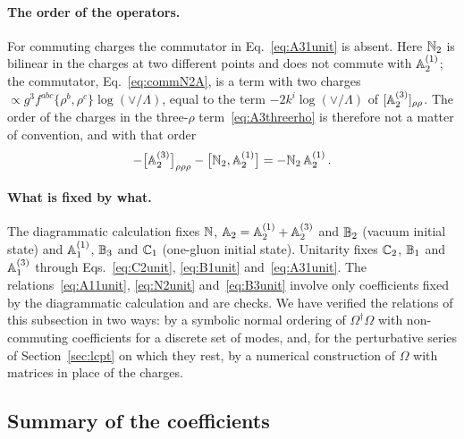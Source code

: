 \paragraph{The order of the operators.} For commuting charges the commutator in Eq.~\eqref{eq:A31unit} is absent. Here $\mathbb{N}_2$ is bilinear in the charges at two different points and does not commute with $\mathbb{A}^{(1)}_2$; the commutator, Eq.~\eqref{eq:commN2A}, is a term with two charges $\propto g^3f^{abc}\{\rho^b,\rho^c\}\log(\vee/\Lambda)$, equal to the term $-2k^i\log(\vee/\Lambda)$ of $[\mathbb{A}^{(3)}_2]_{\rho\rho}$. The order of the charges in the three-$\rho$ term~\eqref{eq:A3threerho} is therefore not a matter of convention, and with that order
\begin{align}\label{eq:N2Acomb}
-\big[\mathbb{A}^{(3)}_2\big]_{\rho\rho\rho}-\big[\mathbb{N}_2,\mathbb{A}^{(1)}_2\big]=-\mathbb{N}_2\,\mathbb{A}^{(1)}_2\,.
\end{align}

\paragraph{What is fixed by what.} The diagrammatic calculation fixes $\mathbb{N}$, $\mathbb{A}_2=\mathbb{A}^{(1)}_2+\mathbb{A}^{(3)}_2$ and $\mathbb{B}_2$ (vacuum initial state) and $\mathbb{A}^{(1)}_1$, $\mathbb{B}_3$ and $\mathbb{C}_1$ (one-gluon initial state). Unitarity fixes $\mathbb{C}_2$, $\mathbb{B}_1$ and $\mathbb{A}^{(3)}_1$ through Eqs.~\eqref{eq:C2unit}, \eqref{eq:B1unit} and~\eqref{eq:A31unit}. The relations~\eqref{eq:A11unit}, \eqref{eq:N2unit} and~\eqref{eq:B3unit} involve only coefficients fixed by the diagrammatic calculation and are checks. We have verified the relations of this subsection in two ways: by a symbolic normal ordering of $\Omega^\dagger\Omega$ with non-commuting coefficients for a discrete set of modes, and, for the perturbative series of Section~\ref{sec:lcpt} on which they rest, by a numerical construction of $\Omega$ with matrices in place of the charges.

\subsection{Summary of the coefficients}\label{sec:coefficients}

